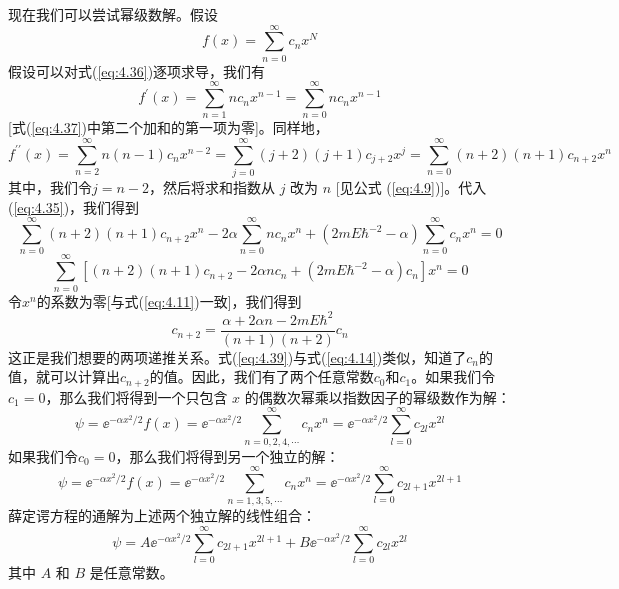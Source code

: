     现在我们可以尝试幂级数解。假设
    \begin{equation}
        f\left(x\right) = \sum_{n=0}^{\infty}c_nx^N
        \label{eq:4.36}
    \end{equation}
    假设可以对式(\ref{eq:4.36})逐项求导，我们有
    \begin{equation}
        f^{\prime}\left(x\right) = \sum_{n=1}^{\infty}nc_nx^{n-1} = \sum_{n=0}^{\infty}nc_nx^{n-1}
        \label{eq:4.37}
    \end{equation}
    [式(\ref{eq:4.37})中第二个加和的第一项为零]。同样地，
    \begin{equation*}
        f^{\prime\prime}\left(x\right) = \sum_{n=2}^{\infty}n(n-1)c_nx^{n-2} = \sum_{j=0}^{\infty}(j+2)(j+1)c_{j+2}x^{j} = \sum_{n=0}^{\infty}(n+2)(n+1)c_{n+2}x^{n}
    \end{equation*}
    其中，我们令$j = n - 2$，然后将求和指数从 $j$ 改为 $n$ [见公式 (\ref{eq:4.9})]。代入 (\ref{eq:4.35})，我们得到
    \begin{equation*}
        \sum_{n=0}^{\infty}\left(n+2\right)\left(n+1\right)c_{n+2}x^n - 2\alpha \sum_{n=0}^{\infty}n c_n x^n + \left(2mE\hbar^{-2} - \alpha\right)\sum_{n=0}^{\infty}c_nx^n = 0
    \end{equation*}
    \begin{equation}
        \sum_{n=0}^{\infty}\left[(n+2)(n+1)c_{n+2} - 2\alpha n c_n + \left(2mE\hbar^{-2} - \alpha\right)c_n\right]x^n = 0
        \label{eq:4.38}
    \end{equation}
    令$x^n$的系数为零[与式(\ref{eq:4.11})一致]，我们得到
    \begin{equation}
        c_{n+2} = \frac{\alpha + 2\alpha n - 2mE\hbar^2}{(n+1)(n+2)}c_n
        \label{eq:4.39}
    \end{equation}
    这正是我们想要的两项递推关系。式(\ref{eq:4.39})与式(\ref{eq:4.14})类似，知道了$c_n$的值，就可以计算出$c_{n+2}$的值。因此，我们有了两个任意常数$c_0$和$c_1$。如果我们令$c_1=0$，那么我们将得到一个只包含 $x$ 的偶数次幂乘以指数因子的幂级数作为解：
    \begin{equation}
        \psi = \ee ^{-\alpha x^2/2}f\left(x\right) = \ee ^{-\alpha x^2/2}\sum_{n=0,2,4,\cdots}^{\infty}c_{n}x^{n} = \ee ^{-\alpha x^2/2}\sum_{l=0}^{\infty}c_{2l}x^{2l}
        \label{eq:4.40}
    \end{equation}
    如果我们令$c_0=0$，那么我们将得到另一个独立的解：
    \begin{equation}
        \psi = \ee ^{-\alpha x^2/2}f\left(x\right) = \ee ^{-\alpha x^2/2}\sum_{n=1,3,5,\cdots}^{\infty}c_{n}x^{n} = \ee ^{-\alpha x^2/2}\sum_{l=0}^{\infty}c_{2l+1}x^{2l+1}
        \label{eq:4.41}
    \end{equation}
    薛定谔方程的通解为上述两个独立解的线性组合：
    \begin{equation}
        \psi = A\ee ^{-\alpha x^2/2}\sum_{l=0}^{\infty}c_{2l+1}x^{2l+1} + B\ee ^{-\alpha x^2/2}\sum_{l=0}^{\infty}c_{2l}x^{2l}
        \label{eq:4.42}
    \end{equation}
    其中 $A$ 和 $B$ 是任意常数。

